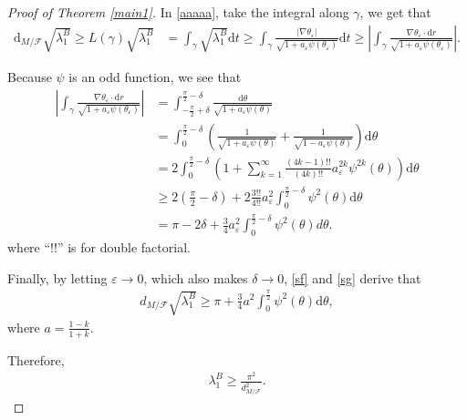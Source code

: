 \documentclass[11pt]{amsart}
\def\d{\mathrm{d}}
\begin{document}
\begin{proof}[Proof of Theorem \ref{main1}]
        In \ref{aaaaa}, take the integral along $\gamma$, we get that
        \begin{align}\label{sf}
            \d_{M/\mathcal{F}}\sqrt{\lambda_1^B}\geq L(\gamma)\sqrt{\lambda_1^B}&=\int_\gamma{\sqrt{\lambda_1^B }\d t}\geq\int_\gamma\frac{\vert\nabla\theta_\varepsilon\vert}{\sqrt{1+a_\varepsilon\psi(\theta_\varepsilon)}} \d t\geq\left\vert\int_\gamma{\frac{\nabla\theta_\varepsilon\cdot \d r}{\sqrt{1+a_\varepsilon\psi(\theta_\varepsilon)}}}\right\vert.
        \end{align}

        Because $\psi$ is an odd function, we see that
        \begin{align}\label{sg}
            \left\vert\int_\gamma{\frac{\nabla\theta_\varepsilon\cdot \d r}{\sqrt{1+a_\varepsilon\psi(\theta_\varepsilon)}}}\right\vert&=\int_{-\frac{\pi}{2}+\delta}^{\frac{\pi}{2}-\delta}{\frac{\d\theta}{\sqrt{1+a_\varepsilon\psi(\theta)}}}\nonumber\\&=\int_{0}^{\frac{\pi}{2}-\delta
            }\left(\frac{1}{\sqrt{1+a_\varepsilon\psi(\theta)}}+\frac{1}{\sqrt{1-a_\varepsilon\psi(\theta)}}\right)\d\theta\nonumber\\&=2\int_0^{\frac{\pi}{2}-\delta}\left(1+\sum_{k=1}^{\infty}{\frac{(4k-1)!!}{(4k)!!}a_\varepsilon^{2k}\psi^{2k}(\theta)}\right)\d\theta\\&\geq 2\left(\frac{\pi}{2}-\delta\right)+2\frac{3!!}{4!!}a_\varepsilon^2\int_0^{\frac{\pi}{2}-\delta}\psi^2(\theta)\d\theta\nonumber\\&=\pi-2\delta+\frac{3}{4}a_\varepsilon^2\int_0^{\frac{\pi}{2}-\delta}\psi^2(\theta)d\theta\nonumber.
        \end{align}where ``$!!$'' is for double factorial.
        
        Finally, by letting $\varepsilon\to 0$, which also makes $\delta\to 0$, \ref{sf} and \ref{sg} derive that 
        \begin{align}\label{uu}
            d_{M/\mathcal{F}}\sqrt{\lambda_1^B}\geq \pi+\frac{3}{4}a^2\int_0^{\frac{\pi}{2}}\psi^2(\theta)\d\theta,
        \end{align}where $a=\frac{1-k}{1+k}$.
        
        Therefore,
        \begin{align*}
            \lambda_1^B\geq\frac{\pi^2}{d_{M/\mathcal{F}}^2}.
        \end{align*}

       

        
\end{proof}
\end{document}
